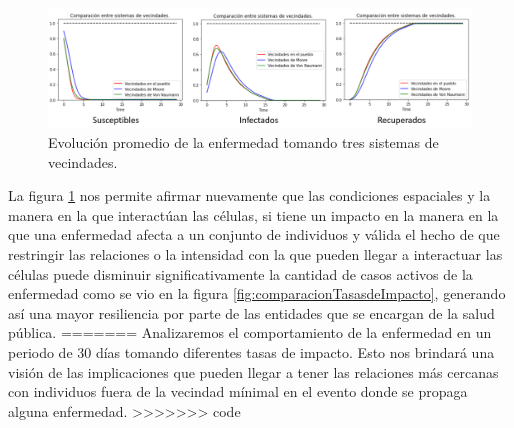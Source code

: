 \newpage

\begin{figure}[h]
  \centering
    \includegraphics[width=1\textwidth]{Imagenes/comparacionSistemasVecindades.PNG}
    \caption{Evolución promedio de la enfermedad tomando tres sistemas de vecindades.}
    \label{fig:comparacionSistemasDeVecindades}
\end{figure}

La figura \ref{fig:comparacionSistemasDeVecindades} nos permite afirmar nuevamente que las condiciones espaciales y la manera en la que interactúan las células, si tiene un impacto en la manera en la que una enfermedad afecta a un conjunto de individuos y válida el hecho de que restringir las relaciones o la intensidad con la que pueden llegar a interactuar las células puede disminuir significativamente la cantidad de casos activos de la enfermedad como se vio en la figura \ref{fig:comparacionTasasdeImpacto}, generando así una mayor resiliencia por parte de las entidades que se encargan de la salud pública.
=======
Analizaremos el comportamiento de la enfermedad en un periodo de 30 días tomando diferentes tasas de impacto. Esto nos brindará una visión de las implicaciones que pueden llegar a tener las relaciones más cercanas con individuos fuera de la vecindad mínimal en el evento donde se propaga alguna enfermedad.
>>>>>>> code
